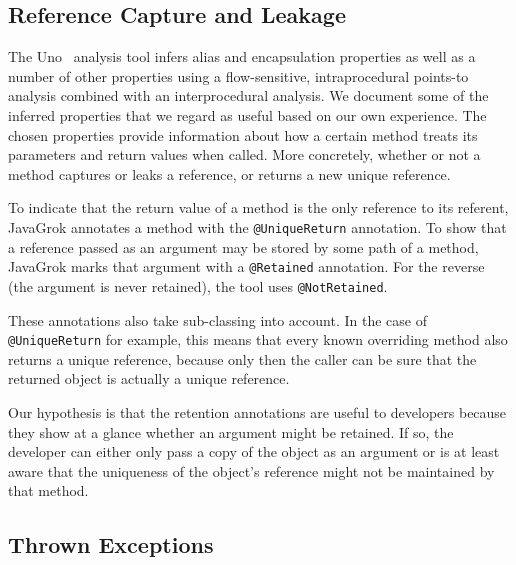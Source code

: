 

\subsection{Reference Capture and Leakage}

The Uno~\cite{Uno} analysis tool infers alias and encapsulation properties as well as a number
of other properties using a flow-sensitive,
intraprocedural points-to analysis combined with an interprocedural analysis.
We document some of the inferred properties that we regard as useful
based on our own experience. The chosen properties 
provide information about how a certain method treats its parameters and 
return values when called. More concretely, whether or not a 
method captures or leaks a reference, or returns a new unique reference.

To indicate that the return value of a method is the only reference to its
referent, JavaGrok annotates a method with the \texttt{@UniqueReturn}
annotation.  To show that a reference passed as an argument may be stored by
some path of a method, JavaGrok marks that argument with a \texttt{@Retained}
annotation.  For the reverse (the argument is never retained), the tool uses
\texttt{@NotRetained}.

These annotations also take sub-classing into account. In the case of
\texttt{@UniqueReturn} for example, this means that every known overriding method
also returns a unique reference, because only then the caller can be sure
that the returned object is actually a unique reference.

Our hypothesis is that the retention annotations are useful to developers
because they show at a glance whether an argument
might be retained. If so, the developer can either only
pass a copy of the object as an argument or is at least aware that the uniqueness
of the object's reference might not be maintained by that method.

\subsection{Thrown Exceptions}

